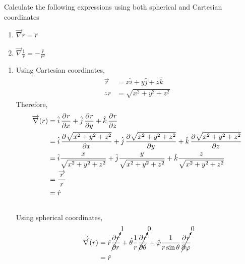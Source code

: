 \documentclass[fleqn, a4paper, 12pt, twoside]{article}
\theoremstyle{definition}
\theoremstyle{theorem}
\begin{document}
\begin{question}
	Calculate the following expressions using both spherical and Cartesian coordinates
	\begin{enumerate}
		\item $\overrightarrow{\nabla} r = \hat{r}$
		\item $\overrightarrow{\nabla} \frac{1}{r} = -\frac{\hat{r}}{r^2}$
	\end{enumerate}
\end{question}

\begin{solution}
	\begin{enumerate}[leftmargin=*]
		\item
			Using Cartesian coordinates,
			\begin{align*}
				\overrightarrow{r} & = x \hat{i} + y \hat{j} + z \hat{k} \\
				\therefore r       & = \sqrt{x^2 + y^2 + z^2}
			\end{align*}
			Therefore,
			\begin{align*}
				\overrightarrow{\nabla} (r) & = \hat{i} \dpd{r}{x} + \hat{j} \dpd{r}{y} + \hat{k} \dpd{r}{z}                                                                      \\
                                                            & = \hat{i} \dpd{\sqrt{x^2 + y^2 + z^2}}{x} + \hat{j} \dpd{\sqrt{x^2 + y^2 + z^2}}{y} + \hat{k} \dpd{\sqrt{x^2 + y^2 + z^2}}{z}       \\
                                                            & = \hat{i} \frac{x}{\sqrt{x^2 + y^2 + z^2}} + \hat{j} \frac{y}{\sqrt{x^2 + y^2 + z^2}} + \hat{k} \frac{z}{\sqrt{x^2 + y^2 + z^2}} \\
                                                            & = \frac{\overrightarrow{r}}{r}                                                                                                   \\
                                                            & = \hat{r}
			\end{align*}
			~\\
			Using spherical coordinates,
			\begin{align*}
				\overrightarrow{\nabla} (r) & = \hat{r} \cancelto{1}{\dpd{r}{r}} + \hat{\theta} \frac{1}{r} \cancelto{0}{\dpd{r}{\theta}} + \hat{\varphi} \frac{1}{r \sin \theta} \cancelto{0}{\dpd{r}{\varphi}} \\
                                                            & = \hat{r}
			\end{align*}

\end{enumerate}
\end{solution}
\end{document}
